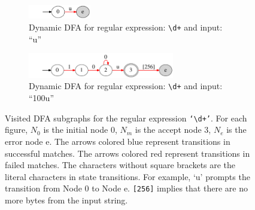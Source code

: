 \begin{figure}[t]
  
  \vspace{12pt}
    \begin{subfigure}[t]{0.45\textwidth}
    \centering
    \includegraphics[width=0.3\textwidth]{figures/digitsunew}
    \vspace{-6pt}
    \caption{Dynamic DFA for regular expression: {\tt \textbackslash d+} and input: ``u''}
    \label{fig:mismatch1}
  \end{subfigure}
  
  \vspace{6pt}
  
  \begin{subfigure}[t]{0.45\textwidth}
    \centering
    \includegraphics[width=0.7\textwidth]{figures/digits100u}
    \vspace{-6pt}
    \caption{Dynamic DFA for regular expression: {\tt \textbackslash d+} and input: ``100u''}
    \label{fig:mismatch2}
  \end{subfigure}
\vspace{-6pt}
\caption{Visited DFA subgraphs for the regular expression {\tt `\textbackslash d+'}.  For each figure, $N_0$ is the initial node 0, $N_m$ is the accept node 3, $N_e$ is the error node e. 
The arrows colored blue represent transitions in successful matches. The arrows colored red represent transitions in failed matches. %
    The characters without square brackets are the literal characters in state transitions. For example, `u' prompts the transition from Node 0 to Node e. {\tt [256]} implies that there are no more bytes from the input string.}
\vspace{-12pt}
\label{fig:dfas}
\end{figure}

